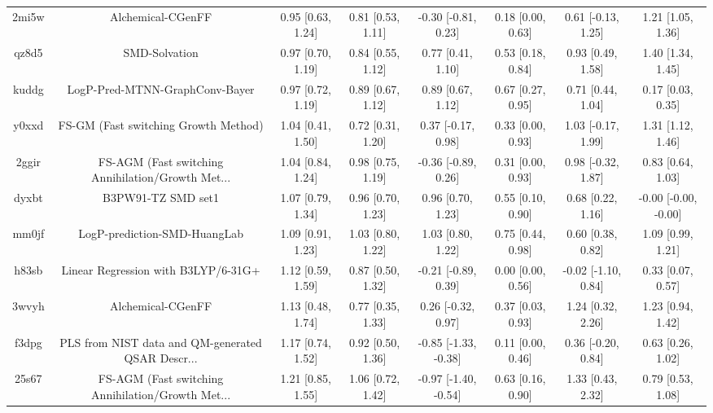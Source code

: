 \documentclass{article}
\begin{document}
\begin{center}
\begin{longtable}{|cccccccc|}
 2mi5w &                                  Alchemical-CGenFF &  0.95 [0.63, 1.24] &  0.81 [0.53, 1.11] &   -0.30 [-0.81, 0.23] &  0.18 [0.00, 0.63] &   0.61 [-0.13, 1.25] &     1.21 [1.05, 1.36] \\
 qz8d5 &                                      SMD-Solvation &  0.97 [0.70, 1.19] &  0.84 [0.55, 1.12] &     0.77 [0.41, 1.10] &  0.53 [0.18, 0.84] &    0.93 [0.49, 1.58] &     1.40 [1.34, 1.45] \\
 kuddg &                     LogP-Pred-MTNN-GraphConv-Bayer &  0.97 [0.72, 1.19] &  0.89 [0.67, 1.12] &     0.89 [0.67, 1.12] &  0.67 [0.27, 0.95] &    0.71 [0.44, 1.04] &     0.17 [0.03, 0.35] \\
 y0xxd &               FS-GM (Fast switching Growth Method) &  1.04 [0.41, 1.50] &  0.72 [0.31, 1.20] &    0.37 [-0.17, 0.98] &  0.33 [0.00, 0.93] &   1.03 [-0.17, 1.99] &     1.31 [1.12, 1.46] \\
 2ggir &  FS-AGM (Fast switching Annihilation/Growth Met... &  1.04 [0.84, 1.24] &  0.98 [0.75, 1.19] &   -0.36 [-0.89, 0.26] &  0.31 [0.00, 0.93] &   0.98 [-0.32, 1.87] &     0.83 [0.64, 1.03] \\
 dyxbt &                                 B3PW91-TZ SMD set1 &  1.07 [0.79, 1.34] &  0.96 [0.70, 1.23] &     0.96 [0.70, 1.23] &  0.55 [0.10, 0.90] &    0.68 [0.22, 1.16] &  -0.00 [-0.00, -0.00] \\
 mm0jf &                       LogP-prediction-SMD-HuangLab &  1.09 [0.91, 1.23] &  1.03 [0.80, 1.22] &     1.03 [0.80, 1.22] &  0.75 [0.44, 0.98] &    0.60 [0.38, 0.82] &     1.09 [0.99, 1.21] \\
 h83sb &                Linear Regression with B3LYP/6-31G+ &  1.12 [0.59, 1.59] &  0.87 [0.50, 1.32] &   -0.21 [-0.89, 0.39] &  0.00 [0.00, 0.56] &  -0.02 [-1.10, 0.84] &     0.33 [0.07, 0.57] \\
 3wvyh &                                  Alchemical-CGenFF &  1.13 [0.48, 1.74] &  0.77 [0.35, 1.33] &    0.26 [-0.32, 0.97] &  0.37 [0.03, 0.93] &    1.24 [0.32, 2.26] &     1.23 [0.94, 1.42] \\
 f3dpg &  PLS from NIST data and QM-generated QSAR Descr... &  1.17 [0.74, 1.52] &  0.92 [0.50, 1.36] &  -0.85 [-1.33, -0.38] &  0.11 [0.00, 0.46] &   0.36 [-0.20, 0.84] &     0.63 [0.26, 1.02] \\
 25s67 &  FS-AGM (Fast switching Annihilation/Growth Met... &  1.21 [0.85, 1.55] &  1.06 [0.72, 1.42] &  -0.97 [-1.40, -0.54] &  0.63 [0.16, 0.90] &    1.33 [0.43, 2.32] &     0.79 [0.53, 1.08] \\

\end{longtable}
\end{center}
\end{document}
